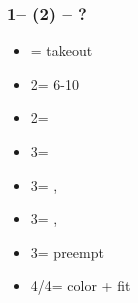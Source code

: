 \documentclass[12pt, a4paper]{article}
\begin{document}
\subsubsection*{1\spades -- (2\hearts) -- ?}
\begin{itemize}
    \item \dbl = takeout
    \item 2\spades = 6-10
    \item 2\nt = \clubs\ \invp
    \item 3\clubs = \diams\ \invp
    \item 3\diams = \spades, \gf
    \item 3\hearts = \spades, \inv
    \item 3\spades = preempt
    \item 4\clubs/4\diams = color + fit
\end{itemize}

\end{document}
